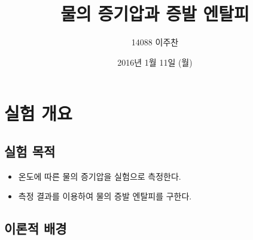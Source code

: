 \documentclass{GSHS-chemexp}
\title{물의 증기압과 증발 엔탈피}
\date{2016년 1월 11일 (월)}
\author{14088 이주찬}
\begin{document}
	\maketitle
	
	\section{실험 개요}
	
	\subsection{실험 목적}
	
	\begin{itemize}
		\item 온도에 따른 물의 증기압을 실험으로 측정한다.
		\item 측정 결과를 이용하여 물의 증발 엔탈피를 구한다.
	\end{itemize}
	
	\subsection{이론적 배경}
	
\end{document}
